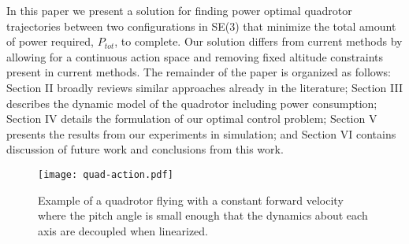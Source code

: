 In this paper we present a solution for finding power optimal quadrotor trajectories between two configurations in SE(3) that minimize the total amount of power required, $P_{tot}$, to complete. Our solution differs from current methods by allowing for a continuous action space and removing fixed altitude constraints present in current methods. The remainder of the paper is organized as follows: Section II broadly reviews similar approaches already in the literature; Section III describes the dynamic model of the quadrotor including power consumption; Section IV details the formulation of our optimal control problem; Section V presents the results from our experiments in simulation; and Section VI contains discussion of future work and conclusions from this work.

\begin{figure}[t]
    \label{QuadAction}
	\centering
	\texttt{[image: quad-action.pdf]}
	\caption{Example of a quadrotor flying with a constant forward velocity where the pitch angle is small enough that the dynamics about each axis are decoupled when linearized.}
\end{figure}
